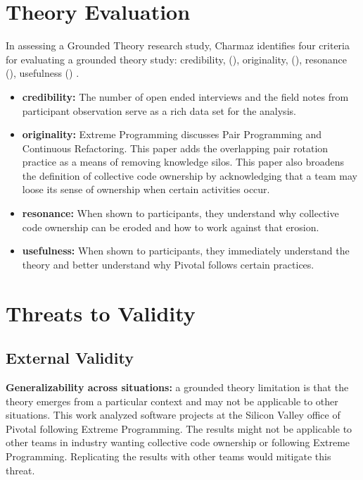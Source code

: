 \section{Theory Evaluation}
\label{TheoryEvaluation}

In assessing a Grounded Theory research study, Charmaz identifies four criteria for evaluating a grounded theory study: credibility, (), originality, (), resonance (), usefulness () \cite{StolGTinSE}. 

\begin{itemize}
\item 
\textbf{credibility:}  The number of open ended interviews and the field notes from participant observation serve as a rich data set for the analysis. 

\item
\textbf{originality:} Extreme Programming discusses Pair Programming and Continuous Refactoring. This paper adds the overlapping pair rotation practice as a means of removing knowledge silos. This paper also broadens the definition of collective code ownership by acknowledging that a team may loose its sense of ownership when certain activities occur.

\item
\textbf{resonance:} When shown to participants, they understand why collective code ownership can be eroded and how to work against that erosion.

\item
\textbf{usefulness:} 
When shown to participants, they immediately understand the theory and better understand why Pivotal follows certain practices. 
\end{itemize}

\section{Threats to Validity}

\subsection{External Validity}

\textbf{Generalizability across situations:} a grounded theory limitation is that the theory emerges from a particular context and may not be applicable to other situations. This work analyzed software projects at the Silicon Valley office of Pivotal following Extreme Programming. The results might not be applicable to other teams in industry wanting collective code ownership or  following Extreme Programming. Replicating the results with other teams would mitigate this threat. 

